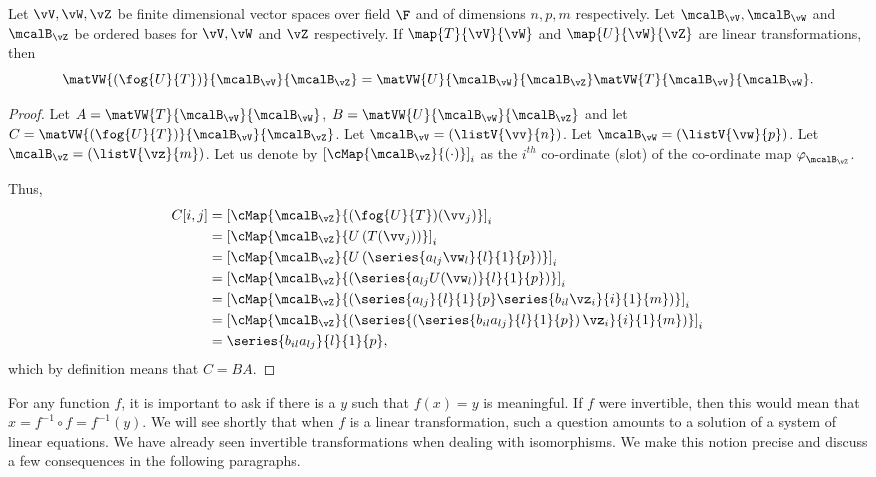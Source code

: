 \begin{Theorem}
    Let $\vV,\vW,\vZ$ be finite dimensional vector spaces over field $\F$ and of dimensions $n,p,m$
    respectively. Let $\mcalB_{\vV},\mcalB_{\vW}$ and $\mcalB_{\vZ}$ be ordered bases for $\vV,\vW$ and $\vZ$
    respectively. If $\map{T}{\vV}{\vW}$ and $\map{U}{\vW}{\vZ}$ are linear transformations, then
    \[\matVW{(\fog{U}{T})}{\mcalB_{\vV}}{\mcalB_{\vZ}} = 
	\matVW{U}{\mcalB_{\vW}}{\mcalB_{\vZ}}\matVW{T}{\mcalB_{\vV}}{\mcalB_{\vW}}. \]
\end{Theorem}
\begin{proof}
    Let $A = \matVW{T}{\mcalB_{\vV}}{\mcalB_{\vW}}$, $B = \matVW{U}{\mcalB_{\vW}}{\mcalB_{\vZ}}$ and let 
    $C = \matVW{(\fog{U}{T})}{\mcalB_{\vV}}{\mcalB_{\vZ}}$.
    Let $\mcalB_{\vV} = \left(\listV{\vv}{n}\right)$. 
    Let $\mcalB_{\vW} = \left(\listV{\vw}{p}\right)$. 
    Let $\mcalB_{\vZ} = \left(\listV{\vz}{m}\right)$. 
    Let us denote by ${\left[\cMap{\mcalB_{\vZ}}{(\cdot)}\right]}_{i}$ as the $i^{th}$ 
    co-ordinate (slot) of the co-ordinate
    map $\varphi^{}_{\mcalB_{\vZ}}$.

    Thus,
    \begin{align*}
	C[i,j] &= {\left[\cMap{\mcalB_{\vZ}}{(\fog{U}{T})(\vv_{j})}\right]}_{i}\\
	& = {\left[\cMap{\mcalB_{\vZ}}{U\left(T(\vv_{j})\right)}\right]}_{i}\\
	& = {\left[\cMap{\mcalB_{\vZ}}{U\left(\series{a_{lj}\vw_{l}}{l}{1}{p}\right)}\right]}_{i}\\
	& = {\left[\cMap{\mcalB_{\vZ}}{\left(\series{a_{lj}U(\vw_{l})}{l}{1}{p}\right)}\right]}_{i}\\
	& = {\left[\cMap{\mcalB_{\vZ}}{\left(\series{a_{lj}}{l}{1}{p}\series{b_{il}\vz_{i}}{i}{1}{m}\right)}\right]}_{i}\\
	& = {\left[\cMap{\mcalB_{\vZ}}{\left(\series{\left(\series{b_{il}a_{lj}}{l}{1}{p}\right)\vz_{i}}{i}{1}{m}\right)}\right]}_{i}\\
	& = \series{b_{il}a_{lj}}{l}{1}{p},\\
    \end{align*}
    which by definition means that $C = BA$.
\end{proof}
For any function $f$, it is important to ask if there is a $y$ such that $f(x) = y$ is meaningful. If $f$ were
invertible, then this would mean that $x = f^{-1}\circ f = f^{-1}(y)$. We will see shortly that when $f$ is a
linear transformation, such a question amounts to a solution of a system of linear equations. We have already
seen invertible transformations when dealing with isomorphisms. We make this notion precise and discuss a few
consequences in the following paragraphs. 

